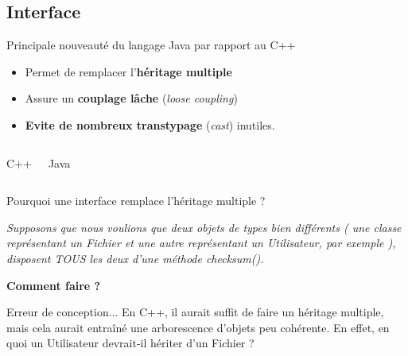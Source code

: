 \documentclass[handout]{beamer}
\begin{document}
\subsection{Interface}
\begin{frame}
	\begin{block}{Principale nouveauté du langage Java par rapport au C++}
		\begin{itemize}
			\item Permet de remplacer l'\textbf{héritage multiple}
			\item Assure un \textbf{couplage lâche} (\textit{loose coupling})
			\item \textbf{Evite de nombreux transtypage} (\textit{cast}) inutiles.
		\end{itemize}
	\end{block}

	\begin{columns}
		\begin{block}{C++}
			
		\end{block}
		\begin{block}{Java}
			
		\end{block}
	\end{columns}
\end{frame}

\begin{frame}
	\begin{block}{Pourquoi une interface remplace l'héritage multiple ?}
	\end{block}
	\textit{Supposons que nous voulions que deux objets de types bien différents ( une classe représentant un Fichier et une autre représentant un Utilisateur, par exemple ), disposent TOUS les deux d'une méthode checksum().}
	\begin{center}
		\textbf{Comment faire ?}
	\end{center} 

	\begin{block}{Erreur de conception...}
	En C++, il aurait suffit de faire un héritage multiple, mais cela aurait entraîné une arborescence d'objets peu cohérente. En effet, en quoi un Utilisateur devrait-il hériter d'un Fichier ?
	\end{block}
\end{frame}
\end{document}
